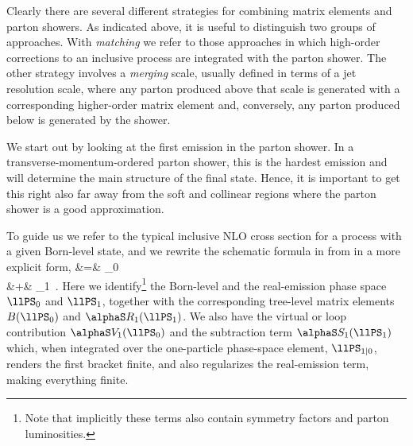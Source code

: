 Clearly there are several different strategies for combining matrix
elements and parton showers. As indicated above, it is useful to
distinguish two groups of approaches.
With \textit{matching} we refer to those approaches
in which high-order corrections to an inclusive process are
integrated with the parton shower.  The other strategy involves a
\textit{merging} scale, usually defined in terms of a jet resolution
scale, where any parton produced above that scale is generated with a
corresponding higher-order matrix element and, conversely, any parton
produced below is generated by the shower.


\label{sec:matching-first}

We start out by looking at the first emission in the parton shower. In
a transverse-momentum-ordered parton shower, this is the hardest
emission and will determine the main structure of the final
state. Hence, it is important to get this right also far away from the
soft and collinear regions where the parton shower is a good
approximation.


To guide us we refer to the typical inclusive NLO cross section for a
process with a given Born-level state, and we rewrite the schematic
formula in  from
 in a more explicit form,
%
\bea
\lld\llxsec{} &=&
\lld\llPS_{0}\nnb\\
&+& \lld\llPS_{1}
\,.
\label{eq:matching:NLO1}
\eea
%
Here we identify\footnote{Note that implicitly these terms also
  contain symmetry factors and parton luminosities.} the Born-level
and the real-emission phase space $\llPS_{0}$ and $\llPS_{1}$, together
with the corresponding tree-level matrix elements $B(\llPS_{0})$ and
$\alphaS R_1(\llPS_{1})$. We also have the virtual or loop
contribution $\alphaS V_1(\llPS_{0})$ and the subtraction term
$\alphaS S_1(\llPS_{1})$ which, when integrated over the
one-particle phase-space element, $\llPS_{1|0}$, renders the first
bracket finite, and also regularizes the real-emission term, making
everything finite.

